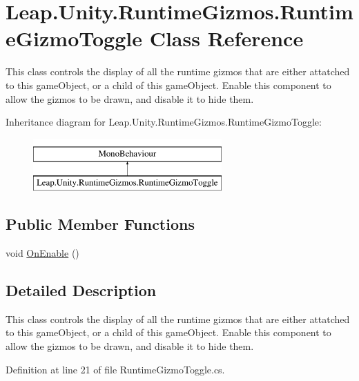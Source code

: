 \hypertarget{class_leap_1_1_unity_1_1_runtime_gizmos_1_1_runtime_gizmo_toggle}{}\section{Leap.\+Unity.\+Runtime\+Gizmos.\+Runtime\+Gizmo\+Toggle Class Reference}
\label{class_leap_1_1_unity_1_1_runtime_gizmos_1_1_runtime_gizmo_toggle}


This class controls the display of all the runtime gizmos that are either attatched to this game\+Object, or a child of this game\+Object. Enable this component to allow the gizmos to be drawn, and disable it to hide them.  


Inheritance diagram for Leap.\+Unity.\+Runtime\+Gizmos.\+Runtime\+Gizmo\+Toggle\+:\begin{figure}[H]
\begin{center}
\leavevmode
\includegraphics[height=2.000000cm]{class_leap_1_1_unity_1_1_runtime_gizmos_1_1_runtime_gizmo_toggle}
\end{center}
\end{figure}
\subsection*{Public Member Functions}
\begin{DoxyCompactItemize}
\item 
void \mbox{\hyperlink{class_leap_1_1_unity_1_1_runtime_gizmos_1_1_runtime_gizmo_toggle_acf13404190ac5eea4ded66cedc734bc9}{On\+Enable}} ()
\end{DoxyCompactItemize}


\subsection{Detailed Description}
This class controls the display of all the runtime gizmos that are either attatched to this game\+Object, or a child of this game\+Object. Enable this component to allow the gizmos to be drawn, and disable it to hide them. 



Definition at line 21 of file Runtime\+Gizmo\+Toggle.\+cs.




